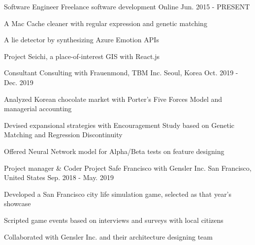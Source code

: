 \begin{cventries}
  \cventry
    {Software Engineer}
    {Freelance software development}
    {Online}
    {Jun. 2015 - PRESENT}
    {
      \begin{cvitems}
        \item {A Mac Cache cleaner with regular expression and genetic matching}
        \item {A lie detector by synthesizing Azure Emotion APIs}
        \item {Project Seichi, a place-of-interest GIS with React.js}
      \end{cvitems}
    }

  \cventry
    {Consultant}
    {Consulting with Frauenmond, TBM Inc.}
    {Seoul, Korea}
    {Oct. 2019 - Dec. 2019}
    {
      \begin{cvitems}
        \item {Analyzed Korean chocolate market with Porter's Five Forces Model and managerial accounting}
        \item {Devised expansional strategies with Encouragement Study based on Genetic Matching and Regression Discontinuity}
        \item {Offered Neural Network model for Alpha/Beta tests on feature designing}
      \end{cvitems}
    }

  \cventry
    {Project manager \& Coder}
    {Project Safe Francisco with Gensler Inc.}
    {San Francisco, United States}
    {Sep. 2018 - May. 2019}
    {
      \begin{cvitems}
        \item {Developed a San Francisco city life simulation game, selected as that year's showcase}
        \item {Scripted game events based on interviews and surveys with local citizens}
        \item {Collaborated with Gensler Inc. and their architecture designing team}
      \end{cvitems}
    }



\end{cventries}
